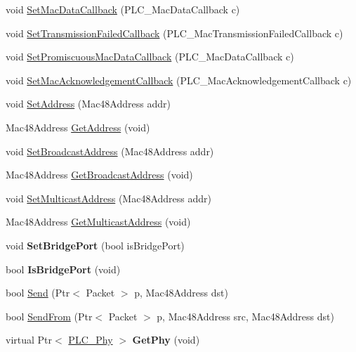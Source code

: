 \begin{DoxyCompactItemize}
\item 
void \hyperlink{classns3_1_1PLC__Mac_a5b550309ff6ad035a09c2a3c7c058b26}{\-Set\-Mac\-Data\-Callback} (\-P\-L\-C\-\_\-\-Mac\-Data\-Callback c)
\item 
void \hyperlink{classns3_1_1PLC__Mac_ad20fd028d921ce08d633321a88a12fbf}{\-Set\-Transmission\-Failed\-Callback} (\-P\-L\-C\-\_\-\-Mac\-Transmission\-Failed\-Callback c)
\item 
void \hyperlink{classns3_1_1PLC__Mac_a7559934a96cf991be041e9d37cabc9e1}{\-Set\-Promiscuous\-Mac\-Data\-Callback} (\-P\-L\-C\-\_\-\-Mac\-Data\-Callback c)
\item 
void \hyperlink{classns3_1_1PLC__Mac_acf71e020e53a0ec928335c41293f7763}{\-Set\-Mac\-Acknowledgement\-Callback} (\-P\-L\-C\-\_\-\-Mac\-Acknowledgement\-Callback c)
\item 
void \hyperlink{classns3_1_1PLC__Mac_aff4743e05c424a501fada149a737bba5}{\-Set\-Address} (\-Mac48\-Address addr)
\item 
\-Mac48\-Address \hyperlink{classns3_1_1PLC__Mac_a72996ab1c4d3ea154520af2be2dc90d7}{\-Get\-Address} (void)
\item 
void \hyperlink{classns3_1_1PLC__Mac_ad1e894db222416136f54c000c133de16}{\-Set\-Broadcast\-Address} (\-Mac48\-Address addr)
\item 
\-Mac48\-Address \hyperlink{classns3_1_1PLC__Mac_abf48c0bee26b87fb32a860685231bc0f}{\-Get\-Broadcast\-Address} (void)
\item 
void \hyperlink{classns3_1_1PLC__Mac_a8a173ec9203052f75089958938222a82}{\-Set\-Multicast\-Address} (\-Mac48\-Address addr)
\item 
\-Mac48\-Address \hyperlink{classns3_1_1PLC__Mac_ad1ec3884c177176da44b1c9aa23ab208}{\-Get\-Multicast\-Address} (void)
\item 
\hypertarget{classns3_1_1PLC__Mac_ac544564d0e9e25ab32488227554ab121}{void {\bfseries \-Set\-Bridge\-Port} (bool is\-Bridge\-Port)}\label{classns3_1_1PLC__Mac_ac544564d0e9e25ab32488227554ab121}

\item 
\hypertarget{classns3_1_1PLC__Mac_a9c4cbe397a9d6753c2061bb51351eeae}{bool {\bfseries \-Is\-Bridge\-Port} (void)}\label{classns3_1_1PLC__Mac_a9c4cbe397a9d6753c2061bb51351eeae}

\item 
bool \hyperlink{classns3_1_1PLC__Mac_aa4aa357fb178a286f334983ab851775f}{\-Send} (\-Ptr$<$ \-Packet $>$ p, \-Mac48\-Address dst)
\item 
bool \hyperlink{classns3_1_1PLC__Mac_a272d80d76488484bf8c60e87d4e6c423}{\-Send\-From} (\-Ptr$<$ \-Packet $>$ p, \-Mac48\-Address src, \-Mac48\-Address dst)
\item 
\hypertarget{classns3_1_1PLC__Mac_afa687f4ae72dd3874ce6bef5ac327ef1}{virtual \-Ptr$<$ \hyperlink{classns3_1_1PLC__Phy}{\-P\-L\-C\-\_\-\-Phy} $>$ {\bfseries \-Get\-Phy} (void)}\label{classns3_1_1PLC__Mac_afa687f4ae72dd3874ce6bef5ac327ef1}


\end{DoxyCompactItemize}
